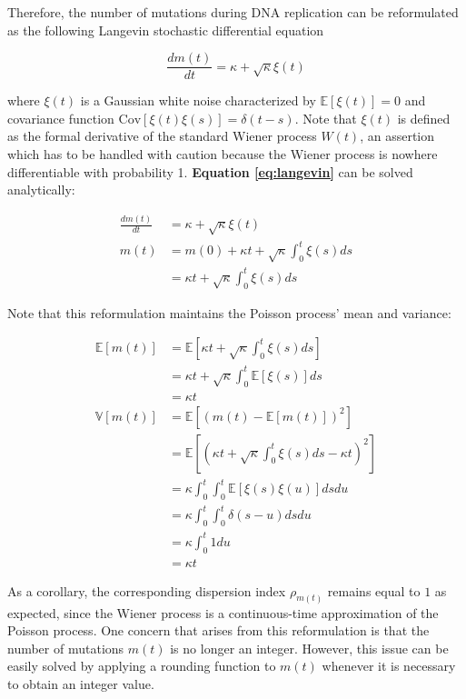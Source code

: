 \documentclass{./LatexTemplate/svproc}
\begin{document}
Therefore, the number of mutations during DNA replication can be reformulated as the following Langevin stochastic differential equation

\begin{equation}
    \frac{dm(t)}{dt} = \kappa + \sqrt{\kappa}\xi(t)\label{eq:langevin}
\end{equation}

where $\xi(t)$ is a Gaussian white noise characterized by $\mathbb{E}\left[\xi(t)\right]=0$ and covariance function $\text{Cov}\left[\xi(t)\xi(s)\right]=\delta (t - s)$. Note that $\xi(t)$ is defined as the formal derivative of the standard Wiener process $W(t)$, an assertion which has to be handled with caution because the Wiener process is nowhere differentiable with probability 1. \textbf{Equation \ref{eq:langevin}} can be solved analytically:

\begin{align}
    \frac{dm(t)}{dt} &= \kappa + \sqrt{\kappa}\xi(t)\nonumber\\
    m(t) &= m(0) + \kappa t + \sqrt{\kappa}\int_0^t \xi(s)ds\nonumber\\
    &= \kappa t + \sqrt{\kappa}\int_0^t \xi(s)ds
\end{align}

Note that this reformulation maintains the Poisson process' mean and variance:

\begin{align}
    \mathbb{E}\left[m(t)\right] &= \mathbb{E}\left[\kappa t + \sqrt{\kappa}\int_0^t \xi(s)ds\right]\\
    &= \kappa t + \sqrt{\kappa}\int_0^t\mathbb{E}\left[\xi(s)\right]ds\nonumber\\
    &= \kappa t\\
    \mathbb{V}\left[m(t)\right] &= \mathbb{E}\left[\left(m(t) - \mathbb{E}\left[m(t)\right]\right)^2\right]\\
    &= \mathbb{E}\left[\left(\kappa t + \sqrt{\kappa}\int_0^t \xi(s)ds - \kappa t \right)^2\right]\nonumber\\
    &= \kappa\int_0^t\int_0^t \mathbb{E}\left[\xi(s)\xi(u)\right]dsdu\nonumber\\
    &= \kappa\int_0^t\int_0^t \delta(s-u) dsdu\nonumber\\
    &= \kappa\int_0^t1du\nonumber\\
    &= \kappa t
\end{align}

As a corollary, the corresponding dispersion index $\rho_{m(t)}$ remains equal to $1$ as expected, since the Wiener process is a continuous-time approximation of the Poisson process. One concern that arises from this reformulation is that the number of mutations $m(t)$ is no longer an integer. However, this issue can be easily solved by applying a rounding function to $m(t)$ whenever it is necessary to obtain an integer value.
\end{document}
